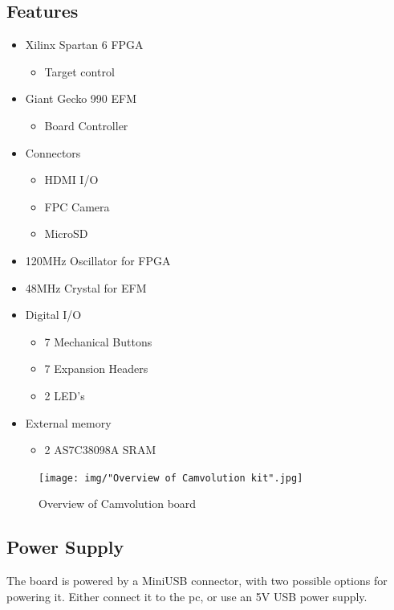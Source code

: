 \subsection{Features}
\begin{itemize}
    \item Xilinx Spartan 6 FPGA
        \begin{itemize}
            \item Target control
        \end{itemize}
    \item Giant Gecko 990 EFM
        \begin{itemize}
            \item Board Controller
        \end{itemize}
    \item Connectors
        \begin{itemize}
            \item HDMI I/O
            \item FPC Camera
            \item MicroSD
        \end{itemize}
    \item 120MHz Oscillator for FPGA
    \item 48MHz Crystal for EFM
    \item Digital I/O
        \begin{itemize}
            \item 7 Mechanical Buttons
            \item 7 Expansion Headers
            \item 2 LED's
        \end{itemize}
    \item External memory
        \begin{itemize}
            \item 2 AS7C38098A SRAM
        \end{itemize}

\end{itemize}


\begin{figure}
    \texttt{[image: img/"Overview of Camvolution kit".jpg]}
    \caption{Overview of Camvolution board}
    \label{fig:BoardLayout}
\end{figure}

\subsection{Power Supply}
The board is powered by a MiniUSB connector, with two possible options for powering it. Either connect it to the pc, or use an 5V USB power supply.

